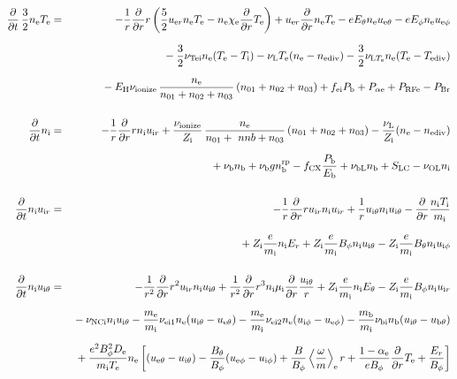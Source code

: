 \documentclass[11pt]{article}
\def\r#1{{\rm#1}}
\def\ddt{\frac{\partial}{\partial t}}
\def\ddr{\frac{\partial}{\partial r}}
\def\ave#1{\left\langle#1\right\rangle}
\def\me{m_\r{e}}
\def\mi{m_\r{i}}
\def\mb{m_\r{b}}
\def\mui{\mu_\r{i}}
\def\De{D_\r{e}}
\def\Di{D_\r{i}}
\def\chie{\chi_\r{e}}
\def\nee{n_\r{e}}
\def\ni{n_\r{i}}
\def\nb{n_\r{b}}
\def\uer{u_{\r{e}r}}
\def\uir{u_{\r{i}r}}
\def\ueth{u_{\r{e}\theta}}
\def\uith{u_{\r{i}\theta}}
\def\ubth{u_{\r{b}\theta}}
\def\ueph{u_{\r{e}\phi}}
\def\uiph{u_{\r{i}\phi}}
\def\ubph{u_{\r{b}\phi}}
\def\Er{E_r}
\def\Eth{E_\theta}
\def\Eph{E_\phi}
\def\Bth{B_\theta}
\def\Bph{B_\phi}
\def\Te{T_\r{e}}
\def\Ti{T_\r{i}}
\def\nna{n_{01}}
\def\nnb{n_{02}}
\def\nnc{n_{03}}
\def\Zi{Z_\r{i}}
\def\Pb{P_\r{b}}
\def\Eb{E_\r{b}}
\def\PRFe{P_\r{RFe}}
\def\PBr{P_\r{Br}}
\def\EH{E_\r{H}}
\def\fei{f_\r{ei}}
\def\nbrp{n_\r{b}^\r{rp}}
\def\fCX{f_\r{CX}}
\def\Palpe{P_{\alpha\r{e}}}
\def\nuNCi{\nu_\r{NCi}}
\def\nube{\nu_\r{be}}
\def\nubi{\nu_\r{bi}}
\def\nuL{\nu_\r{L}}
\def\nuion{\nu_\r{ionize}}
\def\nub{\nu_\r{b}}
\def\nuTei{\nu_\r{Tei}}
\def\vb{v_\r{b}}
\def\nediv{n_\r{ediv}}
\def\Tediv{T_\r{ediv}}
\def\nuLTe{\nu_{\r{L}T_\r{e}}}
\def\nuOL{\nu_\r{OL}}
\def\nubL{\nu_\r{bL}}
\begin{document}
\begin{eqnarray}
\\[5mm]
  \ddt \, \frac{3}{2} \nee \Te &=&
%
 - \frac{1}{r} \ddr r
   \left( \frac{5}{2} \uer \nee \Te - \nee \chie \ddr \Te \right)
%
  +  \uer \ddr \nee \Te
%
  -  e \Eth \nee \ueth
%
  -  e \Eph \nee \ueph 
\nonumber\\[2.5mm]&&{}
%
  - \frac{3}{2} \nuTei \nee (\Te - \Ti)
%
%
  - \nuL \Te (\nee - \nediv)
%
  - \frac{3}{2} \nuLTe \nee (\Te - \Tediv)
\nonumber\\[2.5mm]&&{}
%
  - \EH \nuion\, \frac{\nee}{\nna + \nnb + \nnc}\, (\nna + \nnb + \nnc)
%
  + \fei \Pb
%
  + \Palpe
%
  + \PRFe
%
  - \PBr
\\[5mm]
%
  \ddt\ni &=&
%
  - \frac{1}{r} \ddr r \ni \uir
%
  + \frac{\nuion}{\Zi}\, \frac{\nee}{\nna +\ nnb + \nnc}\, (\nna + \nnb
  + \nnc)
%
  - \frac{\nuL}{\Zi} (\nee - \nediv) 
\nonumber\\[2.5mm]&&{}
%
  + \nub \nb
%
  + \nub g \nbrp
%
  - \fCX \frac{\Pb}{\Eb}
%
  + \nubL \nb
%
  + S_\r{LC}
%
  - \nuOL \ni
%
\\[5mm]
  \ddt \ni \uir &=&
%
  - \frac{1}{r} \ddr r \uir \ni \uir
%
  + \frac{1}{r} \uith \ni \uith
%
  - \ddr \frac{\ni \Ti}{\mi}
\nonumber\\[3mm]&&{}
%
  + \Zi \frac{e}{\mi}\ni \Er
%
  + \Zi \frac{e}{\mi} \Bph \ni \uith
%
  - \Zi \frac{e}{\mi} \Bth \ni \uiph
\\[5mm]
  \ddt \ni \uith &=&
%
  - \frac{1}{r^2} \ddr r^2 \uir \ni \uith
%
  + \frac{1}{r^2} \ddr r^3 \ni \mui \ddr \frac{\uith}{r}
%
  + \Zi \frac{e}{\mi} \ni \Eth
%
  - \Zi \frac{e}{\mi} \Bph \ni \uir
\nonumber\\[2.5mm]&&{}
%
  - \nuNCi \ni \uith
%
  - \frac{\me}{\mi} \nu_\r{ei1} \nee (\uith - \ueth)
%
  - \frac{\me}{\mi} \nu_\r{ei2} \nee (\uiph - \ueph)
%
  - \frac{\mb}{\mi} \nubi \nb (\uith - \ubth)
\nonumber\\[2.5mm]&&{}
%
  + \frac{e^2 \Bph^2 \De}{\mi\Te}\nee
    \left[(\ueth - \uith) - \frac{\Bth}{\Bph}(\ueph - \uiph)
     + \frac{B}{\Bph}\ave{\frac{\omega}{m}}_\r{e} r
     + \frac{1-\alpha_\r{e}}{e\Bph}\ddr \Te + \frac{\Er}{\Bph}\right]
%
%

\end{eqnarray}
\end{document}

